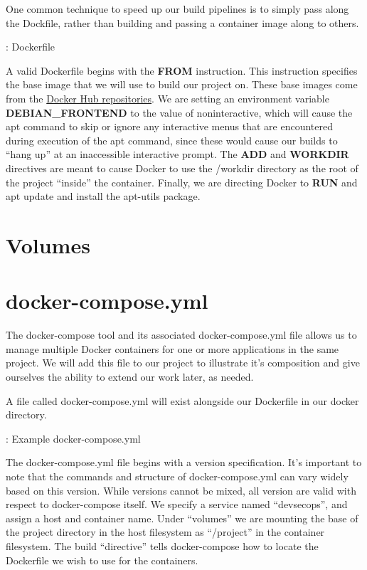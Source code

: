 \justify{}
One common technique to speed up our build pipelines is to simply pass along the Dockfile, rather than
building and passing a container image along to others.

\justify{}
\begin{mybox}{\thetcbcounter: Dockerfile}
  
\end{mybox}

\justify{}
A valid Dockerfile begins with the \textbf{FROM} instruction. This instruction specifies the base image that we
will use to build our project on. These base images come from the
\href{https://docs.docker.com/docker-hub/repos/}{Docker Hub repositories}. We are setting an environment variable
\textbf{DEBIAN\_FRONTEND} to the value of noninteractive, which will cause the apt command to skip or ignore any
interactive menus that are encountered during execution of the apt command, since these would cause
our builds to ``hang up'' at an inaccessible interactive prompt. The \textbf{ADD} and \textbf{WORKDIR} directives
are meant to cause Docker
to use the /workdir directory as the root of the project ``inside'' the
container. Finally, we are directing Docker to \textbf{RUN} and apt
update and install the apt-utils package.

\section{Volumes}

\section{docker-compose.yml}
\justify{}
The docker-compose tool and its associated docker-compose.yml file allows us to manage multiple Docker containers for
one or more applications in the same project. We will add this file to our project to illustrate it's
composition and give ourselves the ability to extend our work later, as needed.

\justify{}
A file called docker-compose.yml will exist
alongside our Dockerfile in our docker directory.

\begin{mybox}{\thetcbcounter: Example docker-compose.yml}
  
\end{mybox}

\justify{}
The docker-compose.yml file begins with a version specification. It's important to note that the commands and structure
of docker-compose.yml can vary widely based on this version. While versions cannot be mixed, all version are valid with
respect to docker-compose itself. We specify a service named ``devsecops'', and assign a host and container name. Under
``volumes'' we are mounting the base of the project directory in the host
filesystem as ``/project'' in the container filesystem. The build
``directive'' tells docker-compose how to locate the Dockerfile we wish to use for the containers.

